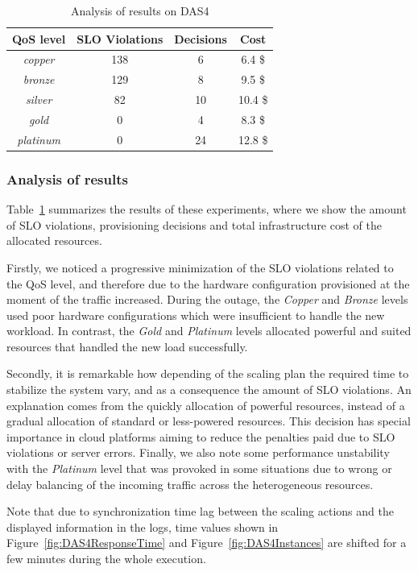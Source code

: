 \begin{table}
  {\scriptsize 
\begin{center}
    \begin{tabular}{  | c | c | c | c  |}
    \hline
         \textbf{QoS level}  & \textbf{SLO Violations} & \textbf{Decisions}  & \textbf{Cost}   \\ \hline
   \textit{copper}   & 138  &  6 &  6.4 \$ \\ \hline   
   \textit{bronze}  &  129 &   8&  9.5 \$  \\ \hline   
   \textit{silver}  &  82  & 10  &  10.4 \$  \\ \hline   
   \textit{gold}  & 0  &  4  &   8.3 \$    \\ \hline   
\textit{platinum} &  0 & 24 & 12.8 \$  \\ \hline   

 \end{tabular}
\end{center}
\vspace{-3mm}
\caption{Analysis of results on DAS4}
\label{summaryDAS4}
}
\end{table}

\subsubsection{Analysis of results}

Table~\ref{summaryDAS4} summarizes the results of these experiments, where we show the amount of SLO violations, provisioning decisions and total infrastructure cost of the allocated resources. 

Firstly, we noticed a progressive minimization of the SLO violations related to the QoS level, and therefore due to the hardware configuration provisioned at the moment of the traffic increased. During the outage, the \emph{Copper} and \emph{Bronze} levels used poor hardware configurations which were insufficient to handle the new workload. In contrast, the \emph{Gold}  and \emph{Platinum} levels allocated powerful and suited resources that handled the new load successfully.

Secondly, it is remarkable how depending of the scaling plan the required time to stabilize the system vary, and as a consequence the amount of SLO violations. An explanation comes from the quickly allocation of powerful resources, instead of a gradual allocation of standard or less-powered resources. This decision has special importance in cloud platforms aiming to reduce the penalties paid due to SLO violations or server errors. Finally, we also note some performance unstability with the \emph{Platinum} level that was provoked in some situations due to wrong or delay balancing of the incoming traffic across the heterogeneous resources.

Note that due to synchronization time lag between the scaling actions and the displayed information in the logs, time values shown in Figure~\ref{fig:DAS4ResponseTime} and Figure~\ref{fig:DAS4Instances} are shifted for a few minutes during the whole execution.

